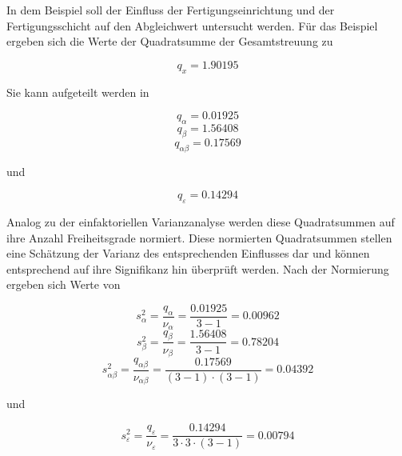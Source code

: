 \clearpage

\noindent In dem Beispiel soll der Einfluss der Fertigungseinrichtung und der Fertigungsschicht auf den Abgleichwert untersucht werden. F\"{u}r das Beispiel ergeben sich die Werte der Quadratsumme der Gesamtstreuung zu

\begin{equation}\label{eq:ninefourtyfour}
q_{x} = 1.90195 
\end{equation}

\noindent Sie kann aufgeteilt werden in

\begin{equation}\label{eq:ninefourtyfive}
q_{\alpha} = 0.01925
\end{equation}
\begin{equation}\label{eq:ninefourtysix}
q_{\beta} = 1.56408
\end{equation}
\begin{equation}\label{eq:ninefourtyseven}
q_{\alpha\beta} = 0.17569
\end{equation}

\noindent und

\begin{equation}\label{eq:ninefourtyeight}
q_{\varepsilon} = 0.14294
\end{equation}

\noindent Analog zu der einfaktoriellen Varianzanalyse werden diese Quadratsummen auf ihre Anzahl Freiheitsgrade normiert. Diese normierten Quadratsummen stellen eine Sch\"{a}tzung der Varianz des entsprechenden Einflusses dar und k\"{o}nnen entsprechend auf ihre Signifikanz hin \"{u}berpr\"{u}ft werden. Nach der Normierung ergeben sich Werte von

\begin{equation}\label{eq:ninefourtynine}
s_{\alpha}^{2} =\dfrac{q_{\alpha}}{\nu _{\alpha}} =\dfrac{0.01925}{3-1} =0.00962
\end{equation}
\begin{equation}\label{eq:ninefifty}
s_{\beta}^{2} =\dfrac{q_{\beta}}{\nu _{\beta}} =\dfrac{1.56408}{3-1} =0.78204
\end{equation}
\begin{equation}\label{eq:ninefiftyone}
s_{\alpha \beta}^{2} =\dfrac{q_{\alpha \beta}}{\nu _{\alpha \beta}} =\dfrac{0.17569}{(3-1)\cdot (3-1)} =0.04392
\end{equation}

\noindent und

\begin{equation}\label{eq:ninefiftytwo}
s_{\varepsilon}^{2} =\dfrac{q_{\varepsilon}}{\nu _{\varepsilon}} =\dfrac{0.14294}{3\cdot 3\cdot (3-1)} =0.00794
\end{equation}

